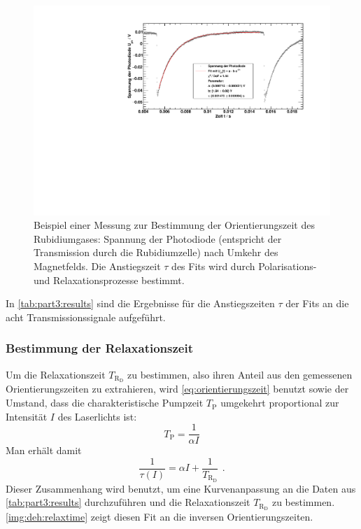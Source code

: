 \begin{figure}[H]
\begin{center}
  \includegraphics[width=\textwidth]{../img/part5/65-5mA-10.pdf}
  \caption{Beispiel einer Messung zur Bestimmung der Orientierungszeit des Rubidiumgases:
  Spannung der Photodiode (entspricht der Transmission durch die Rubidiumzelle)
  nach Umkehr des Magnetfelds.
  Die Anstiegszeit $\tau$ des Fits wird durch Polarisations- und Relaxationsprozesse bestimmt.}
  \label{img:deh:trans3}
\end{center}
\end{figure}


In \autoref{tab:part3:results} sind die Ergebnisse für die Anstiegszeiten $\tau$
der Fits an die acht Transmissionssignale aufgeführt.




\subsubsection*{Bestimmung der Relaxationszeit}
Um die Relaxationszeit $T_{\text{R}_\text{D}}$ zu bestimmen, also ihren Anteil aus den gemessenen Orientierungszeiten zu extrahieren,
wird \autoref{eq:orientierungszeit} benutzt sowie der Umstand,
dass die charakteristische Pumpzeit $T_\text{P}$ umgekehrt proportional zur Intensität $I$ des Laserlichts ist:
\begin{equation}
  T_\text{P} = \frac{1}{\alpha I} 
\end{equation}
Man erhält damit
\begin{equation}
  \frac{1}{\tau(I)}=\alpha I + \frac{1}{T_{\text{R}_\text{D}}} \ \,.
\end{equation}
Dieser Zusammenhang wird benutzt, um eine Kurvenanpassung an die Daten aus \autoref{tab:part3:results}
durchzuführen und die Relaxationszeit $T_{\text{R}_\text{D}}$ zu bestimmen.
\autoref{img:deh:relaxtime} zeigt diesen Fit an die inversen Orientierungszeiten.


